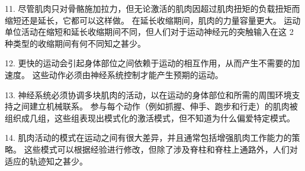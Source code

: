 11. 尽管肌肉只对骨骼施加拉力，但无论激活的肌肉因超过肌肉扭矩的负载扭矩而缩短还是延长，它都可以这样做。
在延长收缩期间，肌肉的力量容量更大。
运动单位活动在缩短和延长收缩期间不同，但人们对于运动神经元的突触输入在这 2 种类型的收缩期间有何不同知之甚少。


12. 更快的运动会引起身体部位之间依赖于运动的相互作用，从而产生不需要的加速度。
这些动作必须由神经系统控制才能产生预期的运动。


13. 神经系统必须协调多块肌肉的活动，以在运动的身体部位和所需的周围环境支持之间建立机械联系。
参与每个动作（例如抓握、伸手、跑步和行走）的肌肉被组织成几组，这些组表现出模式化的激活模式，但不知道为什么偏爱特定模式。


14. 肌肉活动的模式在运动之间有很大差异，并且通常包括增强肌肉工作能力的策略。
这些模式可以根据经验进行修改，但除了涉及脊柱和脊柱上通路外，人们对适应的轨迹知之甚少。



